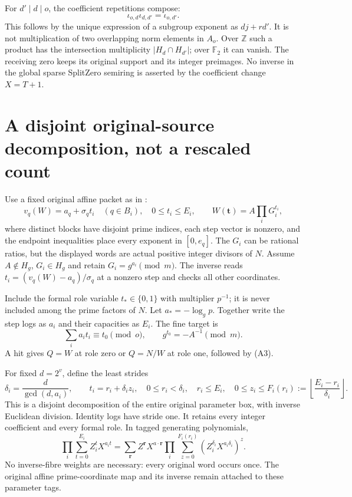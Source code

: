 For $d'\mid d\mid o$, the coefficient repetitions compose:
\[
 \iota_{o,d}\iota_{d,d'}=\iota_{o,d'}.                      \tag{B4}
\]
This follows by the unique expression of a subgroup exponent as $dj+r d'$.
It is not multiplication of two overlapping norm elements in $A_o$.
Over $\mathbb Z$ such a product has the intersection multiplicity
$|H_d\cap H_{d'}|$; over $\mathbb F_2$ it can vanish. The receiving zero keeps
its original support and its integer preimages. No inverse in the global
sparse SplitZero semiring is asserted by the coefficient change $X=T+1$.

\section{A disjoint original-source decomposition, not a rescaled count}
Use a fixed original affine packet as in \cite{Previous}:
\[
 v_q(W)=a_q+\sigma_q t_i\quad(q\in B_i),\quad0\le t_i\le E_i,\qquad
 W(\mathbf t)=A\prod_i G_i^{t_i},                           \tag{C1}
\]
where distinct blocks have disjoint prime indices, each step vector is nonzero,
and the endpoint inequalities place every exponent in $[0,e_q]$.
The $G_i$ can be rational ratios, but the displayed words are actual positive
integer divisors of $N$. Assume $A\notin H_g$, $G_i\in H_g$ and retain
$G_i=g^{a_i}\pmod m$. The inverse reads
$t_i=(v_q(W)-a_q)/\sigma_q$ at a nonzero step and checks all other coordinates.

Include the formal role variable $t_*\in\{0,1\}$ with multiplier $p^{-1}$;
it is never included among the prime factors of $N$. Let $a_*=-\log_g p$.
Together write the step logs as $a_i$ and their capacities as $E_i$.
The fine target is
\[
 \sum_i a_it_i\equiv t_0\pmod o,\qquad
 g^{t_0}=-A^{-1}\pmod m.                                   \tag{C2}
\]
A hit gives $Q=W$ at role zero or $Q=N/W$ at role one, followed by (A3).

For fixed $d=2^v$, define the least strides
\[
 \delta_i=\frac d{\gcd(d,a_i)},\qquad
 t_i=r_i+\delta_i z_i,\quad
 0\le r_i<\delta_i,\quad r_i\le E_i,\quad
 0\le z_i\le F_i(r_i):=\left\lfloor\frac{E_i-r_i}{\delta_i}\right\rfloor.
 \tag{C3}
\]
This is a disjoint decomposition of the entire original parameter box, with
inverse Euclidean division. Identity logs have stride one. It retains every
integer coefficient and every formal role. In tagged generating polynomials,
\[
 \prod_i\sum_{t=0}^{E_i}Z_i^tX^{a_it}
 =\sum_{\mathbf r} Z^{\mathbf r}X^{a\cdot\mathbf r}
   \prod_i\sum_{z=0}^{F_i(r_i)}
          (Z_i^{\delta_i}X^{a_i\delta_i})^z.                \tag{C4}
\]
No inverse-fibre weights are necessary: every original word occurs once.
The original affine prime-coordinate map and its inverse remain attached to
these parameter tags.

